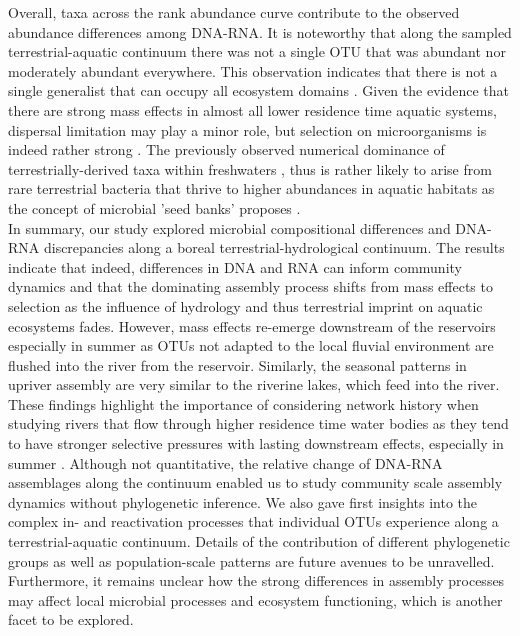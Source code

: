 \documentclass[12pt,a4paper]{article} %
\begin{document}
Overall, taxa across the rank abundance curve contribute to the observed abundance differences among DNA-RNA. It is noteworthy that  along the sampled terrestrial-aquatic continuum there was not a single OTU that was abundant nor moderately abundant everywhere. This observation indicates that there is not a single generalist that can occupy all ecosystem domains \citep{Pandit2009}. Given the evidence that there are strong mass effects in almost all lower residence time aquatic systems, dispersal limitation may play a minor role, but selection on microorganisms is indeed rather strong \citep{Monard2016a}. The previously observed numerical dominance of terrestrially-derived taxa within freshwaters \citep{Ruiz-Gonzalez2015}, thus is rather likely to arise from rare terrestrial bacteria that thrive to higher abundances in aquatic habitats as the concept of microbial 'seed banks' proposes \citep{Lennon2011}. \\[.3cm]

In summary, our study explored microbial compositional differences and DNA-RNA discrepancies along a boreal terrestrial-hydrological continuum. The results indicate that indeed, differences in DNA and RNA can inform community dynamics and that the dominating assembly process shifts from mass effects to selection as the influence of hydrology and thus terrestrial imprint on aquatic ecosystems fades. However, mass effects re-emerge downstream of the reservoirs especially in summer as OTUs not adapted to the local fluvial environment are flushed into the river from the reservoir. Similarly, the seasonal patterns in upriver assembly are very similar to the riverine lakes, which feed into the river. These findings highlight the importance of considering network history when studying rivers that flow through higher residence time water bodies as they tend to have stronger selective pressures with lasting downstream effects, especially in summer \citep{Ward1983}. Although not quantitative, the relative change of DNA-RNA assemblages along the continuum enabled us to study community scale assembly dynamics without phylogenetic inference. We also gave first insights into the complex in- and reactivation processes that individual OTUs experience along a terrestrial-aquatic continuum. Details of the contribution of different phylogenetic groups as well as population-scale patterns are future avenues to be unravelled. Furthermore, it remains unclear how the strong differences in assembly processes may affect local microbial processes and ecosystem functioning, which is another facet to be explored.
\end{document}
